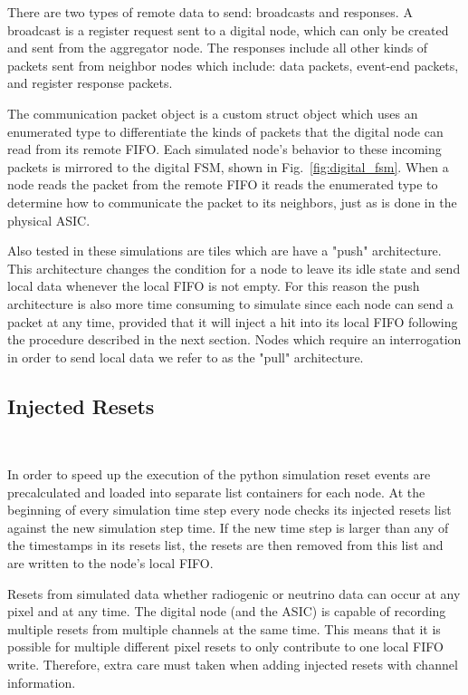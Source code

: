 There are two types of remote data to send: broadcasts and responses.
A broadcast is a register request sent to a digital node, which can only be created and sent from the aggregator node.
The responses include all other kinds of packets sent from neighbor nodes which include: data packets, event-end packets, and register response packets.

The communication packet object is a custom struct object which uses an enumerated type to differentiate the kinds of packets that the digital node can read from its remote FIFO.
Each simulated node's behavior to these incoming packets is mirrored to the digital FSM, shown in Fig.~\ref{fig:digital_fsm}.
When a node reads the packet from the remote FIFO it reads the enumerated type to determine how to communicate the packet to its neighbors, just as is done in the physical ASIC.

Also tested in these simulations are tiles which are have a "push" architecture.
This architecture changes the condition for a node to leave its idle state and send local data whenever the local FIFO is not empty.
For this reason the push architecture is also more time consuming to simulate since each node can send a packet at any time, provided that it will inject a hit into its local FIFO following the procedure described in the next section.
Nodes which require an interrogation in order to send local data we refer to as the "pull" architecture.

\subsection{Injected Resets}~\label{sec:hits}

In order to speed up the execution of the python simulation reset events are precalculated and loaded into separate list containers for each node.
At the beginning of every simulation time step every node checks its injected resets list against the new simulation step time.
If the new time step is larger than any of the timestamps in its resets list, the resets are then removed from this list and are written to the node's local FIFO.

Resets from simulated data whether radiogenic or neutrino data can occur at any pixel and at any time.
The digital node (and the ASIC) is capable of recording multiple resets from multiple channels at the same time.
This means that it is possible for multiple different pixel resets to only contribute to one local FIFO write.
Therefore, extra care must taken when adding injected resets with channel information.

